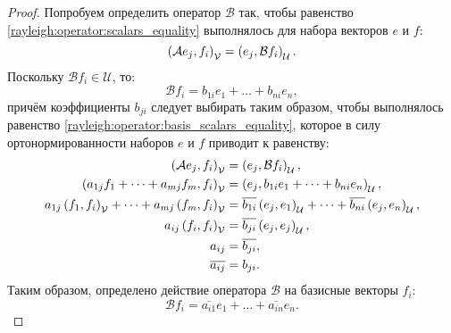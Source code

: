 \begin{proof}
    Попробуем определить оператор $\mathcal{B}$ так, чтобы равенство \eqref{rayleigh:operator:scalars_equality} выполнялось для набора векторов $e$ и $f$:
    \begin{equation}
        \label{rayleigh:operator:basis_scalars_equality}
        \left ( \mathcal{A} e_j, f_i \right )_\mathcal{V} = \left ( e_j, \mathcal{B} f_i \right )_\mathcal{U} .
    \end{equation}
    Поскольку $\mathcal{B} f_i \in \mathcal{U}$, то:
    \[
        \mathcal{B} f_i = b_{1i} e_1 + \dots + b_{ni} e_n ,
    \]
    причём коэффициенты $b_{ji}$ следует выбирать таким образом, чтобы выполнялось равенство \eqref{rayleigh:operator:basis_scalars_equality}, которое в силу
    ортонормированности наборов $e$ и $f$ приводит к равенству:
    \begin{align*}
        \left ( \mathcal{A} e_j, f_i \right )_\mathcal{V} & = \left ( e_j, \mathcal{B} f_i \right )_\mathcal{U} , \\
        \left ( a_{1j} f_1 + \dots + a_{mj} f_m, f_i \right )_\mathcal{V} & = \left ( e_j, b_{1i} e_1 + \dots + b_{ni} e_n \right )_\mathcal{U} , \\
        a_{1j} \left ( f_1, f_i \right )_\mathcal{V} + \dots + a_{mj} \left ( f_m, f_i \right )_\mathcal{V} & = \overline{b_{1i}} \left ( e_j, e_1 \right )_\mathcal{U} + \dots + \overline{b_{ni}} \left ( e_j, e_n \right )_\mathcal{U} , \\
        a_{ij} \left ( f_i, f_i \right )_\mathcal{V} & = \overline{b_{ji}} \left ( e_j, e_j \right )_\mathcal{U} , \\
        a_{ij} & = \overline{b_{ji}} , \\
        \overline{a_{ij}} & = b_{ji} .
    \end{align*}
    Таким образом, определено действие оператора $\mathcal{B}$ на базисные векторы $f_i$:
    \begin{equation}
        \label{rayleigh:operator:basis_images}
        \mathcal{B} f_i = \overline{a_{i1}} e_1 + \dots + \overline{a_{in}} e_n .
    \end{equation}


\end{proof}
